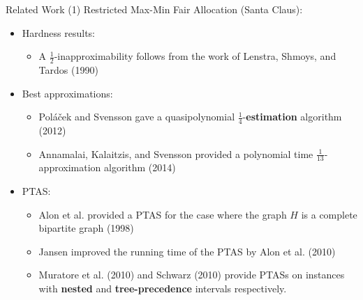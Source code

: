 \begin{frame}[t]{Related Work (1)}
	Restricted Max-Min Fair Allocation (Santa Claus):
	    \begin{itemize}
	    	\item<2-> Hardness results:
                \begin{itemize}
            	    \item<3-> A $\frac{1}{2}$-inapproximability follows from the work of Lenstra, Shmoys, and Tardos (1990)
		        \end{itemize}
            \item<4-> Best approximations:
                \begin{itemize}
                    \item<5-> Pol\'{a}\v{c}ek and Svensson gave a quasipolynomial $\frac{1}{4}$-\textbf{estimation} algorithm (2012)
                    \item<6-> Annamalai, Kalaitzis, and Svensson provided a polynomial time $\frac{1}{13}$-approximation algorithm (2014)
                \end{itemize}
            \item<7-> PTAS:
                \begin{itemize}
                    \item<8-> Alon et al. provided a PTAS for the case where the graph $H$ is a complete bipartite graph (1998)
                    \item<9-> Jansen improved the running time of the PTAS by Alon et al. (2010)
                    \item<10-> Muratore et al. (2010) and Schwarz (2010) provide PTASs on instances with \textbf{nested} and \textbf{tree-precedence} intervals respectively.
                \end{itemize}
	       \end{itemize}
\end{frame}

